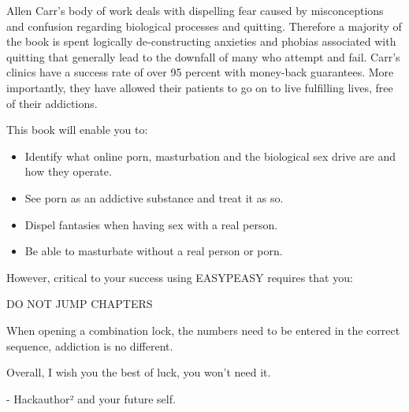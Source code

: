 \documentclass[easypeasy.tex]{subfiles}
\begin{document}
Allen Carr's body of work deals with dispelling fear caused by misconceptions and confusion regarding biological processes and quitting. Therefore a majority of the book is spent logically de-constructing anxieties and phobias associated with quitting that generally lead to the downfall of many who attempt and fail. Carr's clinics have a success rate of over 95 percent with money-back guarantees. More importantly, they have allowed their patients to go on to live fulfilling lives, free of their addictions.

This book will enable you to:
\begin{itemize}
  \item Identify what online porn, masturbation and the biological sex drive are and how they operate.
  \item See porn as an addictive substance and treat it as so.
  \item Dispel fantasies when having sex with a real person.
  \item Be able to masturbate without a real person or porn.
\end{itemize}

However, critical to your success using EASYPEASY requires that you:

{\huge DO NOT JUMP CHAPTERS}

When opening a combination lock, the numbers need to be entered in the correct sequence, addiction is no different.

Overall, I wish you the best of luck, you won't need it.

- Hackauthor² and your future self.
\newpage
\tableofcontents
\end{document}
